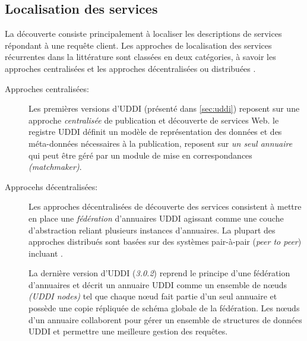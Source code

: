 \subsection{Localisation des services}
\label{sec:ws-localisation}
  La découverte consiste principalement à localiser les descriptions
  de services répondant à une requête client. Les approches de
  localisation des services récurrentes dans la littérature sont
  classées en deux catégories, à savoir les approches centralisées et
  les approches décentralisées ou distribuées
  \cite{garofalakis2004web}.

  \renewcommand{\descriptionlabel}[1]{\hspace{0.1cm}\textbullet~\textsf{#1}}
  \begin{description}
  \item [Approches centralisées:] Les premières versions
    d'\textsc{UDDI} \cite{clement2004uddi} (présenté dans
    \ref{sec:uddi}) reposent sur une approche \textit{centralisée} de
    publication et découverte de services Web. le registre
    \textsc{UDDI} définit un modèle de représentation des données et
    des méta-données nécessaires à la publication, reposent sur
    \textit{un seul annuaire} qui peut être géré par un module de mise
    en correspondances \textit{(matchmaker)}.

  \item [Approcehs décentralisées:] Les approches décentralisées de
    découverte des services \cite{rompothong2003query,
      sivashanmugam2004discovery, paolucci2003using, schmidt2004peer,
      verma2005meteor, sahin2005spider} consistent à mettre en place
    une \textit{fédération} d'annuaires \textsc{UDDI} agissant comme
    une couche d'abstraction reliant plusieurs instances
    d'annuaires. La plupart des approches distribués sont basées sur
    des systèmes pair-à-pair (\textit{peer to peer}) incluant
    \cite{schmidt2004peer, verma2005meteor, sahin2005spider}.

    La dernière version d'\textsc{UDDI} \cite{oasis2005specification}
    (\textit{3.0.2}) reprend le principe d'une fédération d'annuaires
    et décrit un annuaire \textsc{UDDI} comme un ensemble de nœuds
    \textit{(UDDI nodes)} tel que chaque nœud fait partie d'un seul
    annuaire et possède une copie répliquée de schéma globale de la
    fédération. Les nœuds d'un annuaire collaborent pour gérer un
    ensemble de structures de données \textsc{UDDI} et permettre une
    meilleure gestion des requêtes.
  \end{description}

